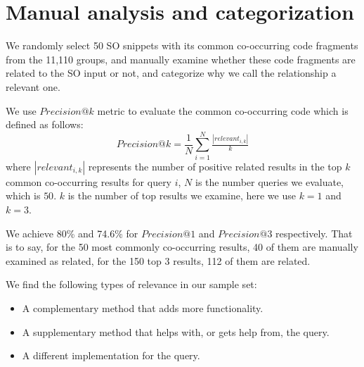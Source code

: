 %
%
%
%

\section{Manual analysis and categorization}
\label{sec:eval}

We randomly select 50 SO snippets with its common co-occurring code fragments from the 11,110 groups, and manually examine whether these code fragments are related to the SO input or not, and categorize why we call the relationship a relevant one.

We use $Precision@k$ metric to evaluate the common co-occurring code  which is defined as follows:
\begin{equation}
Precision@k = \frac{1}{N}\sum_{i=1}^{N}\tfrac{\left | relevant_{i,k} \right |}{k}
\end{equation}
where $\left | relevant_{i,k} \right |$ represents the number of positive related results in the top $k$ common co-occurring results for query $i$, $N$ is the number queries we evaluate, which is $50$. $k$ is the number of top results we examine, here we use $k=1$ and $k=3$.

We achieve 80\% and 74.6\% for $Precision@1$ and $Precision@3$ respectively. That is to say, for the 50 most commonly co-occurring results, 40 of them are manually examined as related, for the 150 top 3 results, 112 of them are related.

We find the following types of relevance in our sample set:
\begin{itemize}
	\item A complementary method that adds more functionality.
	\item A supplementary method that helps with, or gets help from, the query. 
	\item A different implementation for the query.	
\end{itemize}


